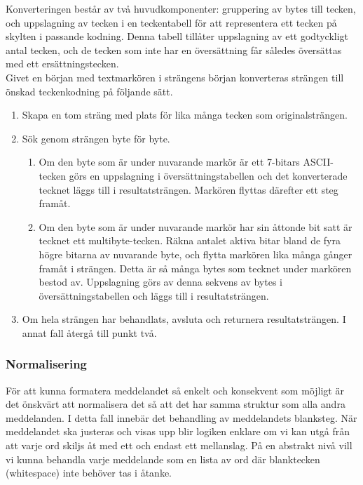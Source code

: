 \documentclass[a4paper,11pt]{article}
\begin{document}
Konverteringen består av två huvudkomponenter: gruppering av bytes till tecken, och uppslagning av tecken i en teckentabell för att representera ett tecken på skylten i passande kodning. Denna tabell tillåter uppslagning av ett godtyckligt antal tecken, och de tecken som inte har en översättning får således översättas med ett ersättningstecken. \\

Givet en början med textmarkören i strängens början konverteras strängen till önskad teckenkodning på följande sätt.
	
	\begin{enumerate}
    	\item Skapa en tom sträng med plats för lika många tecken som originalsträngen.
    	\item Sök genom strängen byte för byte.
    		\begin{enumerate}
        	\item Om den byte som är under nuvarande markör är ett 7-bitars ASCII-tecken görs en uppslagning i översättningstabellen och det konverterade tecknet läggs till i resultatsträngen. Markören flyttas därefter ett steg framåt.
        	\item Om den byte som är under nuvarande markör har sin åttonde bit satt är tecknet ett multibyte-tecken. Räkna antalet aktiva bitar bland de fyra högre bitarna av nuvarande byte, och flytta markören lika många gånger framåt i strängen. Detta är så många bytes som tecknet under markören bestod av. Uppslagning görs av denna sekvens av bytes i översättningstabellen och läggs till i resultatsträngen.
        	\end{enumerate}
    	\item Om hela strängen har behandlats, avsluta och returnera resultatsträngen. I annat fall återgå till punkt två.
	\end{enumerate}
	
\subsubsection{Normalisering}
För att kunna formatera meddelandet så enkelt och konsekvent som möjligt är det önskvärt att normalisera det så att det har samma struktur som alla andra meddelanden. I detta fall innebär det behandling av meddelandets blanksteg. När meddelandet ska justeras och visas upp blir logiken enklare om vi kan utgå från att varje ord skiljs åt med ett och endast ett mellanslag. På en abstrakt nivå vill vi kunna behandla varje meddelande som en lista av ord där blanktecken (whitespace) inte behöver tas i åtanke. \\
\end{document}
